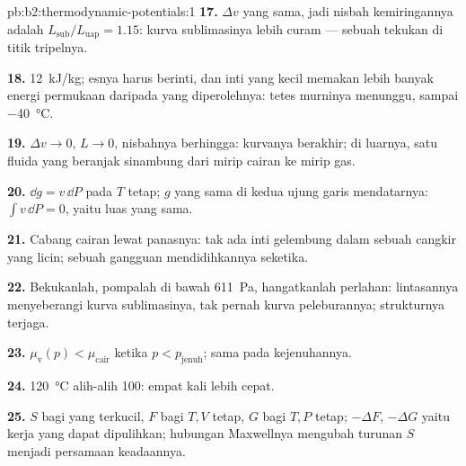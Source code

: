 \begin{solution}{pb:b2:thermodynamic-potentials:1}
\textbf{17.} $\Delta v$ yang sama, jadi nisbah kemiringannya adalah $L_{\text{sub}}/L_{\text{uap}}
= 1.15$: kurva sublimasinya lebih curam --- sebuah tekukan di titik tripelnya.

\textbf{18.} \qty{12}{kJ/kg}; esnya harus berinti, dan inti yang kecil memakan
lebih banyak energi permukaan daripada yang diperolehnya: tetes murninya menunggu, sampai
\qty{-40}{\celsius}.

\textbf{19.} $\Delta v \to 0$, $L \to 0$, nisbahnya berhingga: kurvanya berakhir;
di luarnya, satu fluida yang beranjak sinambung dari mirip cairan ke mirip gas.

\textbf{20.} $\dd g = v\,\dd P$ pada $T$ tetap; $g$ yang sama di kedua ujung
garis mendatarnya: $\int v\,\dd P = 0$, yaitu luas yang sama.

\textbf{21.} Cabang cairan lewat panasnya: tak ada inti gelembung dalam sebuah
cangkir yang licin; sebuah gangguan mendidihkannya seketika.

\textbf{22.} Bekukanlah, pompalah di bawah \qty{611}{Pa}, hangatkanlah perlahan: lintasannya
menyeberangi kurva sublimasinya, tak pernah kurva peleburannya; strukturnya
terjaga.

\textbf{23.} $\mu_{\text{v}}(p) < \mu_{\text{cair}}$ ketika $p < p_{\text{jenuh}}$; sama pada
kejenuhannya.

\textbf{24.} \qty{120}{\celsius} alih-alih \qty{100}{}: empat kali lebih cepat.

\textbf{25.} $S$ bagi yang terkucil, $F$ bagi $T,V$ tetap, $G$ bagi $T,P$ tetap;
$-\Delta F$, $-\Delta G$ yaitu kerja yang dapat dipulihkan; hubungan Maxwellnya mengubah
turunan $S$ menjadi persamaan keadaannya.
\end{solution}
